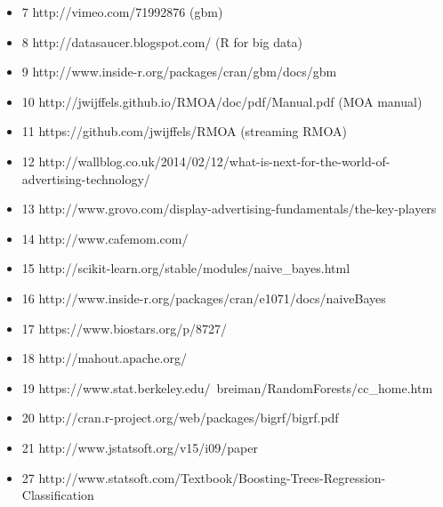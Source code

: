 \documentclass[a4paper]{article}
\begin{document}
\begin{itemize}
  \item 7 http://vimeo.com/71992876 (gbm)
  \item 8 http://datasaucer.blogspot.com/ (R for big data)
  \item 9 http://www.inside-r.org/packages/cran/gbm/docs/gbm
  \item 10 http://jwijffels.github.io/RMOA/doc/pdf/Manual.pdf (MOA manual)
  \item 11 https://github.com/jwijffels/RMOA (streaming RMOA)
  \item 12 http://wallblog.co.uk/2014/02/12/what-is-next-for-the-world-of-advertising-technology/
  \item 13 http://www.grovo.com/display-advertising-fundamentals/the-key-players
  \item 14 http://www.cafemom.com/
  \item 15 http://scikit-learn.org/stable/modules/naive\_bayes.html
  \item 16 http://www.inside-r.org/packages/cran/e1071/docs/naiveBayes
  \item 17 https://www.biostars.org/p/8727/
  \item 18 http://mahout.apache.org/
  \item 19 https://www.stat.berkeley.edu/~breiman/RandomForests/cc\_home.htm
  \item 20 http://cran.r-project.org/web/packages/bigrf/bigrf.pdf
  \item 21 http://www.jstatsoft.org/v15/i09/paper
  \item 27 http://www.statsoft.com/Textbook/Boosting-Trees-Regression-Classification
\end{itemize}
\end{document}
